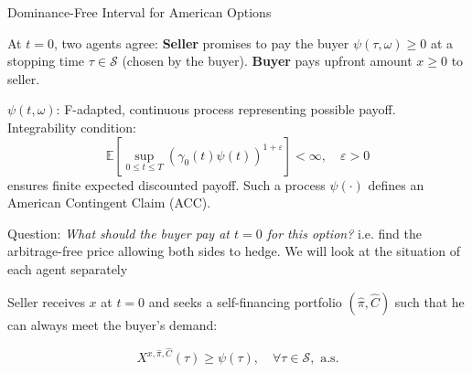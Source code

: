 \documentclass{beamer}
\begin{document}
\begin{frame}{Dominance-Free Interval for American Options}

    {\footnotesize \footnotesize
   \par At \( t = 0 \), two agents agree: \textbf{Seller} promises to pay the buyer \(\psi(\tau, \omega) \geq 0\)
     at a stopping time \(\tau \in \mathcal{S}\) (chosen by the buyer). 
     \textbf{Buyer} pays upfront amount \(x \geq 0\) to seller.
     \vspace{1em}
    \par \(\psi(t, \omega)\): F-adapted, continuous process representing possible payoff. Integrability condition:
    \[
    \mathbb{E} \left[ \sup_{0 \leq t \leq T} \left( \gamma_0(t) \psi(t) \right)^{1 + \varepsilon} \right] < \infty, \quad \varepsilon > 0
    \]
    ensures finite expected discounted payoff. Such a process \(\psi(\cdot)\) defines an American Contingent Claim (ACC).
    \vspace{1em}
    \par Question: \textit{What should the buyer pay at \(t = 0\) for this option?}  
    i.e. find the arbitrage-free price allowing both sides to hedge. We will look at the situation of each agent
    separately
    \vspace{1em}
    \par Seller receives \(x\) at \(t = 0\) and seeks a self-financing portfolio \((\hat{\pi}, \hat{C})\) such that he can always meet the buyer's demand:

\[
X^{x,\hat{\pi},\hat{C}}(\tau) \geq \psi(\tau), \quad \forall \tau \in \mathcal{S}, \text{ a.s.}
\]
    }
\end{frame} 
\end{document}
